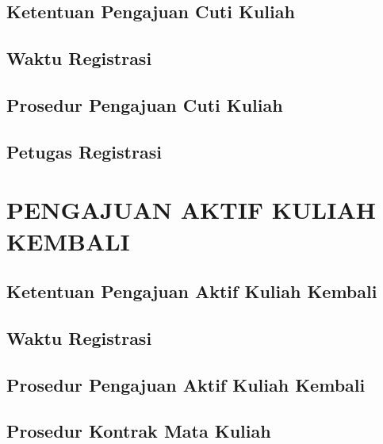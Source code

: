 \documentclass[
]{book}
\begin{document}
\hypertarget{ketentuan-pengajuan-cuti-kuliah}{%
\section{Ketentuan Pengajuan Cuti Kuliah}\label{ketentuan-pengajuan-cuti-kuliah}}

\hypertarget{waktu-registrasi}{%
\section{Waktu Registrasi}\label{waktu-registrasi}}

\hypertarget{prosedur-pengajuan-cuti-kuliah}{%
\section{Prosedur Pengajuan Cuti Kuliah}\label{prosedur-pengajuan-cuti-kuliah}}

\hypertarget{petugas-registrasi}{%
\section{Petugas Registrasi}\label{petugas-registrasi}}

\hypertarget{pengajuan-aktif-kuliah-kembali}{%
\chapter{PENGAJUAN AKTIF KULIAH KEMBALI}\label{pengajuan-aktif-kuliah-kembali}}

\hypertarget{ketentuan-pengajuan-aktif-kuliah-kembali}{%
\section{Ketentuan Pengajuan Aktif Kuliah Kembali}\label{ketentuan-pengajuan-aktif-kuliah-kembali}}

\hypertarget{waktu-registrasi}{%
\section{Waktu Registrasi}\label{waktu-registrasi}}

\hypertarget{prosedur-pengajuan-aktif-kuliah-kembali}{%
\section{Prosedur Pengajuan Aktif Kuliah Kembali}\label{prosedur-pengajuan-aktif-kuliah-kembali}}

\hypertarget{prosedur-kontrak-mata-kuliah}{%
\section{Prosedur Kontrak Mata Kuliah}\label{prosedur-kontrak-mata-kuliah}}
\end{document}
